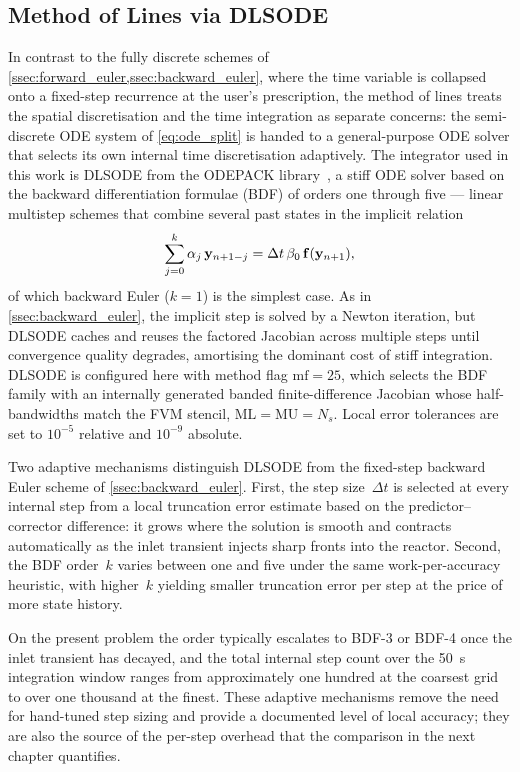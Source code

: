 \subsection{Method of Lines via DLSODE}\label{ssec:lsoda}

In contrast to the fully discrete schemes of \cref{ssec:forward_euler,ssec:backward_euler}, where the time variable is collapsed onto a fixed-step recurrence at the user's prescription, the method of lines treats the spatial discretisation and the time integration as separate concerns: the semi-discrete ODE system of \cref{eq:ode_split} is handed to a general-purpose ODE solver that selects its own internal time discretisation adaptively. The integrator used in this work is DLSODE from the ODEPACK library~\cite{Hindmarsh1983}, a stiff ODE solver based on the backward differentiation formulae (BDF) of orders one through five --- linear multistep schemes that combine several past states in the implicit relation
\begin{equation*}
  \sum_{j=0}^{k}\alpha_j\,\mathbf{y}_{n+1-j} = \Delta t\,\beta_0\,\mathbf{f}(\mathbf{y}_{n+1}),
\end{equation*}
of which backward Euler (\(k = 1\)) is the simplest case. As in \cref{ssec:backward_euler}, the implicit step is solved by a Newton iteration, but DLSODE caches and reuses the factored Jacobian across multiple steps until convergence quality degrades, amortising the dominant cost of stiff integration. DLSODE is configured here with method flag \(\mathrm{mf} = 25\), which selects the BDF family with an internally generated banded finite-difference Jacobian whose half-bandwidths match the FVM stencil, \(\mathrm{ML} = \mathrm{MU} = N_s\). Local error tolerances are set to \(10^{-5}\) relative and \(10^{-9}\) absolute.

Two adaptive mechanisms distinguish DLSODE from the fixed-step backward Euler scheme of \cref{ssec:backward_euler}. First, the step size~\(\Delta t\) is selected at every internal step from a local truncation error estimate based on the predictor--corrector difference: it grows where the solution is smooth and contracts automatically as the inlet transient injects sharp fronts into the reactor. Second, the BDF order~\(k\) varies between one and five under the same work-per-accuracy heuristic, with higher~\(k\) yielding smaller truncation error per step at the price of more state history. 

On the present problem the order typically escalates to BDF-3 or BDF-4 once the inlet transient has decayed, and the total internal step count over the \SI{50}{\second} integration window ranges from approximately one hundred at the coarsest grid to over one thousand at the finest. These adaptive mechanisms remove the need for hand-tuned step sizing and provide a documented level of local accuracy; they are also the source of the per-step overhead that the comparison in the next chapter quantifies.

